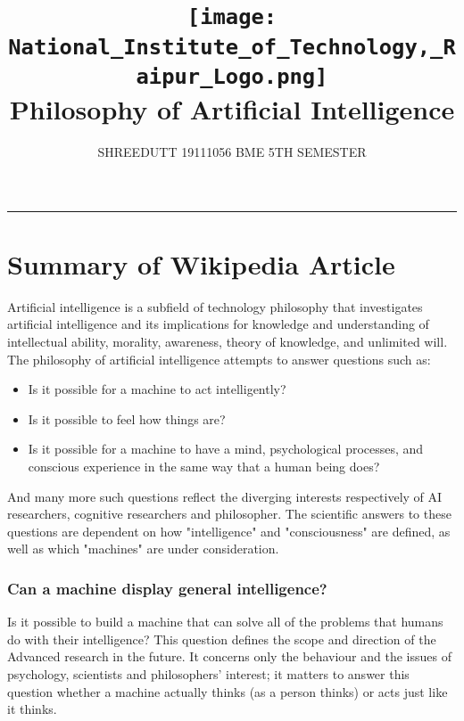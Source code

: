 \documentclass[13pt,letterpaper]{article}
\begin{document}
\title{
\texttt{[image: National\_Institute\_of\_Technology,\_Raipur\_Logo.png]}
 \\ 
Philosophy of Artificial Intelligence
}

\author{SHREEDUTT 19111056 BME 5TH SEMESTER}

\maketitle
\rule{\textwidth}{0.5pt}
\nolinebreak[4]
\section*{Summary of Wikipedia Article}
Artificial intelligence is a subfield of technology philosophy that investigates artificial intelligence and its implications for knowledge and understanding of intellectual ability, morality, awareness, theory of knowledge, and unlimited will.
The philosophy of artificial intelligence attempts to answer questions such as:
\nolinebreak[4]
\begin{itemize}
  \item Is it possible for a machine to act intelligently?
  \item Is it possible to feel how things are?
  \item Is it possible for a machine to have a mind, psychological processes, and conscious experience in the same way that a human being does?
\end{itemize}
And many more such questions reflect the diverging interests respectively of AI researchers, cognitive researchers and philosopher. The scientific answers to these questions are dependent on how "intelligence" and "consciousness" are defined, as well as which "machines" are under consideration.\\
\subsubsection* {Can a machine display general intelligence?}
Is it possible to build a machine that can solve all of the problems that humans do with their intelligence? This question defines the scope and direction of the Advanced research in the future. It concerns only the behaviour and the issues of psychology,  scientists and philosophers' interest; it matters to answer this question whether a machine actually thinks (as a person thinks) or acts just like it thinks.
\nolinebreak[4]
\end{document}
